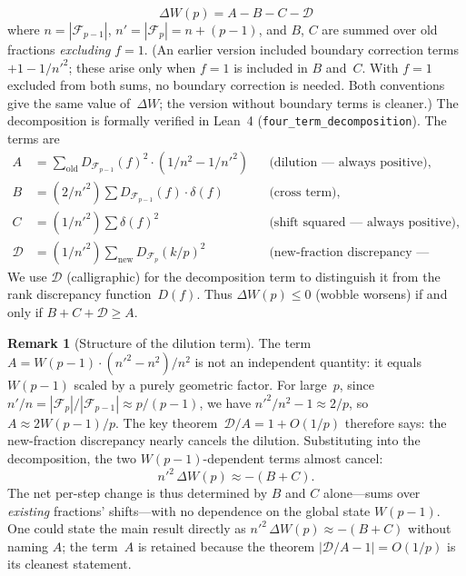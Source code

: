 \documentclass[11pt]{article}
\theoremstyle{definition}
\newtheorem{remark}[theorem]{Remark}
\newcommand{\F}{\mathcal{F}}
\begin{document}
\begin{equation}
  \Delta W(p) = A - B - C - \mathcal{D}
\end{equation}
where $n = |\F_{p-1}|$, $n' = |\F_p| = n + (p-1)$, and
$B$, $C$ are summed over old fractions \emph{excluding}
$f = 1$.  (An earlier version included boundary correction
terms $+1 - 1/{n'}^2$; these arise only when $f = 1$ is
included in $B$ and~$C$.  With $f = 1$ excluded from both
sums, no boundary correction is needed.  Both conventions
give the same value of~$\Delta W$; the version without
boundary terms is cleaner.)
The decomposition is formally verified
in Lean~4 (\texttt{four\_term\_decomposition}).  The
terms are
\begin{align*}
  A &= \textstyle\sum_{\text{old}} D_{\F_{p-1}}(f)^2 \cdot
       (1/n^2 - 1/{n'}^2) && \text{(dilution --- always positive),}\\
  B &= (2/{n'}^2)\textstyle\sum D_{\F_{p-1}}(f) \cdot \delta(f)
       && \text{(cross term),}\\
  C &= (1/{n'}^2)\textstyle\sum \delta(f)^2
       && \text{(shift squared --- always positive),}\\
  \mathcal{D} &= (1/{n'}^2)\textstyle\sum_{\text{new}} D_{\F_p}(k/p)^2
       && \text{(new-fraction discrepancy --- always positive).}
\end{align*}
We use $\mathcal{D}$ (calligraphic) for the decomposition term to
distinguish it from the rank discrepancy function~$D(f)$.
Thus $\Delta W(p) \le 0$ (wobble worsens) if and only if
$B + C + \mathcal{D} \ge A$.

\begin{remark}[Structure of the dilution term]
The term $A = W(p-1) \cdot (n'^2 - n^2)/n^2$ is not an
independent quantity: it equals $W(p-1)$ scaled by a purely
geometric factor.  For large~$p$, since $n'/n = |\F_p|/|\F_{p-1}|
\approx p/(p-1)$, we have $n'^2/n^2 - 1 \approx 2/p$, so
$A \approx 2W(p-1)/p$.  The key theorem~$\mathcal{D}/A =
1 + O(1/p)$ therefore says: the new-fraction discrepancy
nearly cancels the dilution.  Substituting into the
decomposition, the two $W(p-1)$-dependent terms almost cancel:
\[
  n'^2\,\Delta W(p) \approx -(B + C).
\]
The net per-step change is thus determined by $B$ and $C$
alone---sums over \emph{existing} fractions' shifts---with
no dependence on the global state $W(p-1)$.  One could state
the main result directly as $n'^2\,\Delta W(p) \approx -(B+C)$
without naming $A$; the term~$A$ is retained because the
theorem $|\mathcal{D}/A - 1| = O(1/p)$ is its cleanest statement.
\end{remark}
\end{document}
